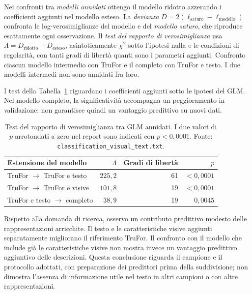 Nei confronti tra \emph{modelli annidati} ottengo il modello ridotto azzerando i coefficienti aggiunti nel modello esteso. La \emph{devianza} $D=2(\ell_{\mathrm{saturo}}-\ell_{\mathrm{modello}})$ confronta le log-verosimiglianze del modello e del \emph{modello saturo}, che riproduce esattamente ogni osservazione. Il \emph{test del rapporto di verosimiglianza} usa $\Lambda=D_{\mathrm{ridotto}}-D_{\mathrm{esteso}}$, asintoticamente $\chi^2$ sotto l'ipotesi nulla e le condizioni di regolarità, con tanti gradi di libertà quanti sono i parametri aggiunti. Confronto ciascun modello intermedio con TruFor e il completo con TruFor e testo. I due modelli intermedi non sono annidati fra loro.

I test della Tabella~\ref{tab:associazione-rapporti-verosimiglianza} riguardano i coefficienti aggiunti sotto le ipotesi del GLM. Nel modello completo, la significatività accompagna un peggioramento in validazione: non garantisce quindi un vantaggio predittivo su nuovi dati.

\begin{table}[htbp]
    \centering\small
    \caption{Test del rapporto di verosimiglianza tra GLM annidati. I due valori di $p$ arrotondati a zero nel report sono indicati con $p<0{,}0001$. Fonte: \texttt{classification\_visual\_text.txt}.}
    \label{tab:associazione-rapporti-verosimiglianza}
    \begin{tabular}{@{}lrrr@{}}
        \toprule
        Estensione del modello & $\Lambda$ & Gradi di libertà & $p$ \\
        \midrule
        TruFor $\rightarrow$ TruFor e testo & $225{,}2$ & 61 & $<0{,}0001$ \\
        TruFor $\rightarrow$ TruFor e visive & $101{,}8$ & 19 & $<0{,}0001$ \\
        TruFor e testo $\rightarrow$ completo & $38{,}9$ & 19 & $0{,}0045$ \\
        \bottomrule
    \end{tabular}
\end{table}

\newpage
Rispetto alla domanda di ricerca, osservo un contributo predittivo modesto delle rappresentazioni arricchite. Il testo e le caratteristiche visive aggiunti separatamente migliorano il riferimento TruFor. Il confronto con il modello che include già le caratteristiche visive non mostra invece un vantaggio predittivo aggiuntivo delle descrizioni. Questa conclusione riguarda il campione e il protocollo adottati, con preparazione dei predittori prima della suddivisione; non dimostra l'assenza di informazione utile nel testo in altri campioni o con altre rappresentazioni.

